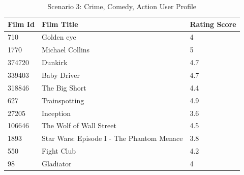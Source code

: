 \begin{table}[H]
    \centering
    \begin{tabular}{p{} p{} p{}}
    \hline
    \textbf{Film Id} & \textbf{Film Title} & \textbf{Rating Score} \\ \hline
    710 & Golden eye & 4 \\
    1770 & Michael Collins & 5 \\
    374720 & Dunkirk & 4.7 \\
    339403 & Baby Driver & 4.7 \\
    318846 & The Big Short & 4.4 \\
    627 & Trainspotting & 4.9 \\
    27205 & Inception & 3.6 \\
    106646 & The Wolf of Wall Street & 4.5 \\
    1893 & Star Wars: Episode I - The Phantom Menace & 3.8 \\
    550 & Fight Club & 4.2 \\
    98 & Gladiator & 4 \\ \hline
    \end{tabular}
    \caption{Scenario 3: Crime, Comedy, Action User Profile}
    \label{tab:scenario3_user_profile}
    \end{table}
    
